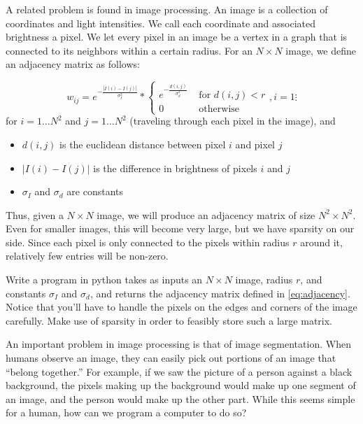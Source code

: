A related problem is found in image processing.  An image is a collection of coordinates and light intensities.  We call each coordinate and associated brightness a pixel. We let every pixel in an image be a vertex in a graph that is connected to its neighbors within a certain radius.  For an $N \times N$ image, we define an adjacency matrix as follows:

\begin{equation}
\label{eq:adjacency}
w_{ij} = e^{-\frac{|I(i) - I(j)|}{\sigma_I^2}} * \begin{cases} e^{-\frac{d(i,j)}{\sigma_d^2}} & \mbox{ for $d(i,j) < r$} \\ 0 & \mbox{ otherwise} \end{cases}, i = 1 \vdots
\end{equation}
for $i = 1 \hdots N^2$ and $j = 1 \hdots N^2$ (traveling through each pixel in the image), and 
\begin{itemize}
	\item$d(i,j)$ is the euclidean distance between pixel $i$ and pixel $j$ 
	\item $|I(i) - I(j)|$ is the difference in brightness of pixels $i$ and $j$
	\item $\sigma_I$ and $\sigma_d$ are constants
\end{itemize} 
Thus, given a $N\times N$ image, we will produce an adjacency matrix of size $N^2\times N^2$.  Even for smaller images, this will become very large, but we have sparsity on our side.  Since each pixel is only connected to the pixels within radius $r$ around it, relatively few entries will be non-zero.

\begin{problem}  Write a program in python takes as inputs an $N \times N$ image, radius $r$, and constants $\sigma_I$ and $\sigma_d$, and returns the adjacency matrix defined in \eqref{eq:adjacency}.  Notice that you'll have to handle the pixels on the edges and corners of the image carefully. Make use of sparsity in order to feasibly store such a large matrix.
\end{problem}

An important problem in image processing is that of image segmentation.  When humans observe an image, they can easily pick out portions of an image that ``belong together.''  For example, if we saw the picture of a person against a black background, the pixels making up the background would make up one segment of an image, and the person would make up the other part.  While this seems simple for a human, how can we program a computer to do so?

